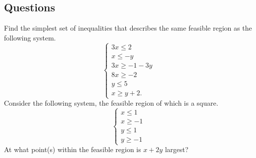 \subsection*{Questions}
\begin{questions}
  \question Find the simplest set of inequalities that describes the same feasible region as the following system.
            \begin{displaymath}
              \begin{cases}
                3x \leq 2\\
                x \leq -y\\
                3x \geq -1 - 3y\\
                8x \geq -2\\
                y \leq 5\\
                x \geq y + 2.
              \end{cases}
            \end{displaymath}
  \question Consider the following system, the feasible region of which is a square.
            \begin{displaymath}
              \begin{cases}
                x \leq 1\\
                x \geq -1\\
                y \leq 1\\
                y \geq -1
              \end{cases}
            \end{displaymath}
            At what point(s) within the feasible region is $ x + 2y $ largest?
\end{questions}


